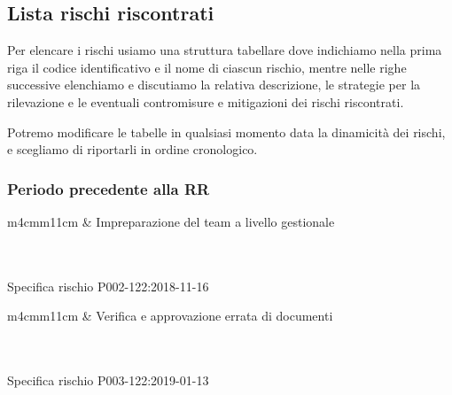 	\subsection{Lista rischi riscontrati}

	Per elencare i rischi usiamo una struttura tabellare dove indichiamo nella prima riga il codice identificativo e il nome di ciascun rischio, mentre nelle righe successive elenchiamo e discutiamo la relativa descrizione, le strategie per la rilevazione e le eventuali contromisure e mitigazioni dei rischi riscontrati.\par

	Potremo modificare le tabelle in qualsiasi momento data la dinamicità dei rischi, e scegliamo di riportarli in ordine cronologico.

	\subsubsection{Periodo precedente alla RR}

	\begin{table}[H]
		\begin{risktable}{\columnwidth}{m{4cm}m{11cm}}
			 &
			Impreparazione del team a livello gestionale \\
			\rowcolor{\tablegray}
			\\
			\\
		\end{risktable}
		\caption{Specifica rischio P002-122:2018-11-16}
	\end{table}
	
	\mydoublerule{\linewidth}{0pt}{2pt}
	
	\begin{table}[H]
		\begin{risktable}{\columnwidth}{m{4cm}m{11cm}}
			 &
			Verifica e approvazione errata di documenti \\
			\rowcolor{\tablegray}
			\\
			\\
		\end{risktable}
		\caption{Specifica rischio P003-122:2019-01-13}
	\end{table}


